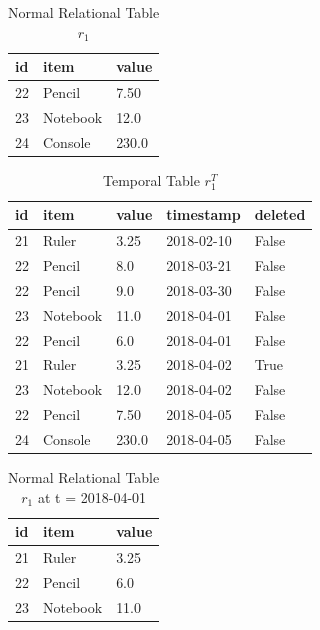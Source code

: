 		\begin{center}
		\begin{table}[t]
			\centering
			\caption{Normal Relational Table $r_1$}
			\label{table:normal_table_2}
			\begin{tabular}{p{4cm}p{4cm}p{4cm}}
				\hline
				id & item      & value  \\ \hline
				22 & Pencil    & 7.50 \\
				23 & Notebook & 12.0   \\ 
				24 & Console & 230.0 \\ \hline
			\end{tabular}
		\end{table}

		\begin{table}[t]
			\centering
			\caption{Temporal Table $r_1^T$}
			\label {table:temporal_table_2}
			\begin{tabular}{p{1cm}p{2cm}p{3cm}p{3cm}p{2cm}}
				\hline
				id & item      & value  & timestamp  & deleted\\ \hline
				21 & Ruler    & 3.25  & 2018-02-10  &  False \\  
				22 & Pencil    & 8.0  & 2018-03-21  &  False \\
				22 & Pencil    & 9.0  & 2018-03-30  &  False\\
				23 & Notebook & 11.0  & 2018-04-01 & False \\
				22 & Pencil & 6.0  & 2018-04-01 & False \\
				21 & Ruler    & 3.25  & 2018-04-02  &  True \\
				23 & Notebook & 12.0  & 2018-04-02 & False \\ 
				22 & Pencil & 7.50  & 2018-04-05 & False \\ 
				24 & Console & 230.0  & 2018-04-05 & False \\ \hline
			\end{tabular}
		\end{table}
		\end{center}
		\begin{center}
		\begin{table}
			\centering
			\caption{Normal Relational Table $r_1$ at t = 2018-04-01}
			\label{table:normal_table_2_t}
			\begin{tabular}{p{4cm}p{4cm}p{4cm}}
				\hline
				id & item  & value  \\ \hline
				21 & Ruler & 3.25 \\
				22 & Pencil & 6.0   \\ 
				23 & Notebook & 11.0 \\ \hline
			\end{tabular}
		\end{table}
		\end{center}

